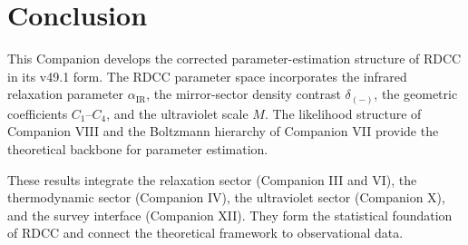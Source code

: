 \documentclass[11pt,a4paper]{article}
\begin{document}
\section{Conclusion}

This Companion develops the corrected parameter-estimation structure of RDCC in
its v49.1 form. The RDCC parameter space incorporates the infrared relaxation
parameter $\alpha_{\mathrm{IR}}$, the mirror-sector density contrast
$\delta_{(-)}$, the geometric coefficients $C_1$–$C_4$, and the ultraviolet
scale $M$. The likelihood structure of Companion VIII and the Boltzmann
hierarchy of Companion VII provide the theoretical backbone for parameter
estimation.

These results integrate the relaxation sector (Companion III and VI), the
thermodynamic sector (Companion IV), the ultraviolet sector (Companion X), and
the survey interface (Companion XII). They form the statistical foundation of
RDCC and connect the theoretical framework to observational data.
\end{document}
